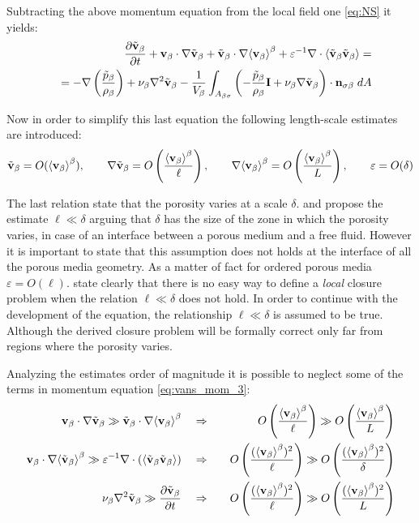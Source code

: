 Subtracting the above momentum equation from the local field one \eqref{eq:NS} it yields:
\begin{eqnarray}
&&  \dfrac{\partial \tilde{\textbf{v}}_{\beta}}{\partial t} + \textbf{v}_{\beta} \cdot \nabla \tilde{\textbf{v}}_{\beta} + \tilde{\textbf{v}}_{\beta} \cdot \nabla {\left< \textbf{v}_{\beta}\right>}^{\beta} + \varepsilon^{-1}\nabla \cdot  {\left< \tilde{\textbf{v}}_{\beta}\tilde{\textbf{v}}_{\beta}\right>} = \nonumber \\
&&= -\nabla \left(\dfrac{\tilde{p}_{\beta}}{\rho_{\beta}}\right) + \nu_{\beta} \nabla^2 \tilde{\textbf{v}}_{\beta}  - \dfrac{1}{V_\beta} \displaystyle\int_{A_{\beta \sigma}} \left(-\dfrac{\tilde{p}_{\beta}}{\rho_{\beta}} \mathbf{I}  + \nu_{\beta} \nabla \tilde{\textbf{v}}_{\beta} \right) \cdot \mathbf{n}_{\sigma \beta} \;dA
\label{eq:vans_mom_3}
\end{eqnarray}

Now in order to simplify this last equation the following length-scale estimates are introduced:
$$ \tilde{\textbf{v}}_{\beta} = O({\left< \textbf{v}_{\beta} \right>}^{\beta}), \qquad \nabla\tilde{\textbf{v}}_{\beta} = O \left(\dfrac{{\left< \textbf{v}_{\beta} \right>}^{\beta}}{\ell} \right), \qquad  \nabla {\left< \textbf{v}_{\beta}\right>}^{\beta} = O\left(\dfrac{{\left< \textbf{v}_{\beta} \right>}^{\beta}}{L}\right), \qquad \varepsilon = O(\delta) $$

The last relation state that the porosity varies at a scale $\delta$. \citet{valdes2013velocity} and \citet{ochoa1995momentum} propose the estimate $\ell \ll \delta$ arguing that $\delta$ has the size of the zone in which the porosity varies, in case of an interface between a porous medium and a free fluid.
However it is important to state that this assumption does not holds at the interface of all the porous media geometry. As a matter of fact for ordered porous media $\varepsilon = O(\ell)$.
\citet{whitaker1996forchheimer} state clearly that there is no easy way to define a \textit{local} closure problem when the relation $\ell \ll \delta$ does not hold.
In order to continue with the development of the equation, the relationship $\ell \ll \delta$ is assumed to be true. Although the derived closure problem will be formally correct only far from regions where the porosity varies.

Analyzing the estimates order of magnitude it is possible to neglect some of the terms in momentum equation \eqref{eq:vans_mom_3}:
\begin{eqnarray}
\textbf{v}_{\beta} \cdot \nabla \tilde{\textbf{v}}_{\beta} \gg \tilde{\textbf{v}}_{\beta} \cdot \nabla {\left< \textbf{v}_{\beta}\right>}^{\beta} \quad &\Rightarrow&  \quad O\left(\dfrac{{\left< \textbf{v}_{\beta} \right>}^{\beta}}{\ell}\right) \gg O\left(\dfrac{{\left< \textbf{v}_{\beta} \right>}^{\beta}}{L} \right) \\
\textbf{v}_{\beta} \cdot \nabla {\left< \tilde{\textbf{v}}_{\beta}\right>}^{\beta} \gg  \varepsilon^{-1} \nabla \cdot \left({\left< \tilde{\textbf{v}}_{\beta} \tilde{\textbf{v}}_{\beta} \right>}\right)  \quad &\Rightarrow& \quad O\left(\dfrac{({\left< \textbf{v}_{\beta} \right>}^{\beta})^2}{\ell}\right) \gg O\left(\dfrac{({\left< \textbf{v}_{\beta} \right>}^{\beta})^2}{\delta} \right) \label{eq:sbs}\\
\nu_{\beta} \nabla^2 \tilde{\textbf{v}}_{\beta} \gg  \dfrac{\partial \tilde{\textbf{v}}_{\beta}}{\partial t}  \quad &\Rightarrow&  \quad O\left(\dfrac{({\left< \textbf{v}_{\beta} \right>}^{\beta})^2}{\ell}\right) \gg O\left(\dfrac{({\left< \textbf{v}_{\beta} \right>}^{\beta})^2}{L} \right) 
\end{eqnarray}

